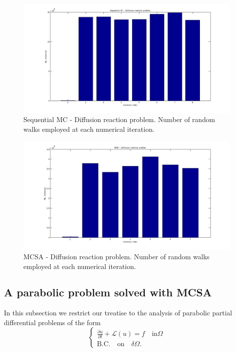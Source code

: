 \documentclass[a4paper,10pt]{article}
\begin{document}
\begin{figure}[h!]
  \centering
    \includegraphics[width=\textwidth]{SEQ_diffreac.jpg}
      \caption{Sequential MC - Diffusion reaction problem. Number of random 
walks 
employed at each 
numerical iteration.}
\label{SEQ_diffreac}
\end{figure}


\begin{figure}[h!]
  \centering
    \includegraphics[width=\textwidth]{MCSA_diffreac.jpg}
      \caption{MCSA - Diffusion reaction problem. Number of random walks 
employed at each 
numerical iteration.}
\label{MCSA_diffreac}
\end{figure}


\subsection{A parabolic problem solved with MCSA}
In this subsection we restrict our treatise to the analysis of parabolic 
partial 
differential problems of the form 
\begin{equation}
\begin{cases}
 \frac{\partial u }{\partial t} + \mathcal{L}(u)=f \quad \text{in} \Omega \\
\text{B.C.} \quad \text{on}\quad \delta \Omega.
\end{cases}
\label{parabolic}
\end{equation}
\end{document}
